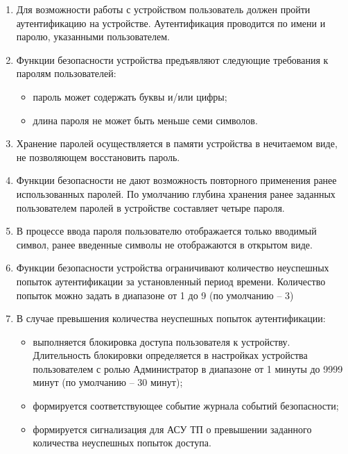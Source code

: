 \color{black}

\begin{enumerate}

\item
Для возможности работы с устройством пользователь должен пройти аутентификацию на устройстве. Аутентификация проводится по имени и паролю, указанными пользователем. 
\item
Функции безопасности устройства предъявляют следующие требования к паролям пользователей:
\begin{itemize}
    \item пароль может содержать буквы и/или цифры;
    \item длина пароля не может быть меньше семи символов. 
\end{itemize}
\item
Хранение паролей осуществляется в памяти устройства в нечитаемом виде, не позволяющем восстановить пароль.
\item
Функции безопасности не дают возможность повторного применения ранее использованных паролей. По умолчанию глубина хранения ранее заданных пользователем паролей в устройстве составляет четыре пароля.
\item
В процессе ввода пароля пользователю отображается только вводимый символ, ранее введенные символы не отображаются в открытом виде.
\item
Функции безопасности устройства ограничивают количество неуспешных попыток аутентификации за установленный период времени. Количество попыток можно задать в диапазоне от 1 до 9 (по умолчанию – 3)
\item
В случае превышения количества неуспешных попыток аутентификации:
\begin{itemize}
    \item выполняется блокировка доступа пользователя к устройству. Длительность блокировки определяется в настройках устройства пользователем с ролью Администратор в диапазоне от 1 минуты до 9999 минут (по умолчанию – 30 минут);
    \item формируется соответствующее событие журнала событий безопасности;
    \item формируется сигнализация для АСУ ТП о превышении заданного количества неуспешных попыток доступа. 

\end{itemize}
\end{enumerate}
